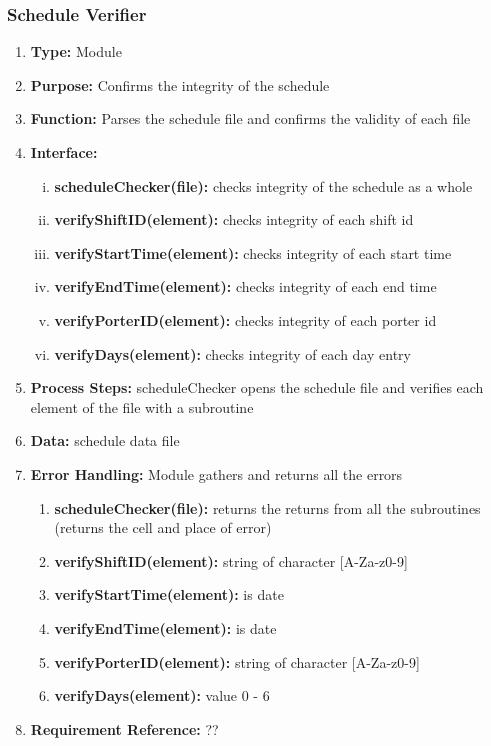 \documentclass[paper=letter, fontsize=10pt]{scrartcl}
\numberwithin{equation}{section}		%
\numberwithin{figure}{section}			%
\numberwithin{table}{section}				%
\begin{document}
\subsubsection{Schedule Verifier}
\begin{enumerate}[]
	\item \textbf{Type:} Module
	\item \textbf{Purpose:} Confirms the integrity of the schedule
	\item \textbf{Function:} Parses the schedule file and confirms the validity of each file
	\item \textbf{Interface:} 
	\begin{enumerate}[(i)]
		\item \textbf{scheduleChecker(file):} checks integrity of the schedule as a whole
		\item \textbf{verifyShiftID(element):} checks integrity of each shift id  
		\item \textbf{verifyStartTime(element):} checks integrity of each start time 
		\item \textbf{verifyEndTime(element):} checks integrity of each end time 
		\item \textbf{verifyPorterID(element):} checks integrity of each porter id 
		\item \textbf{verifyDays(element):} checks integrity of each day entry
	\end{enumerate}
	\item \textbf{Process Steps:} scheduleChecker opens the schedule file and verifies each element of the file with a subroutine
	\item \textbf{Data:} schedule data file
	\item \textbf{Error Handling:} Module gathers and returns all the errors
	\begin{enumerate}[]
		\item \textbf{scheduleChecker(file):} returns the returns from all the subroutines (returns the cell and place of error)
		\item \textbf{verifyShiftID(element):} string of character [A-Za-z0-9] 
		\item \textbf{verifyStartTime(element):} is date
		\item \textbf{verifyEndTime(element):} is date
		\item \textbf{verifyPorterID(element):} string of character [A-Za-z0-9] 
		\item \textbf{verifyDays(element):} value 0 - 6
	\end{enumerate}
	\item \textbf{Requirement Reference:} ??
\end{enumerate}
\end{document}
